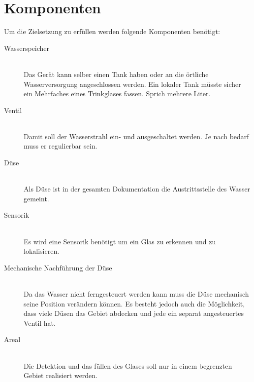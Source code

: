 \section{Komponenten}


Um die Zielsetzung zu erfüllen werden folgende Komponenten benötigt:

	\begin{description}
		\item[Wasserspeicher] \hfill \\ 
			Das Gerät kann selber einen Tank haben oder an die örtliche Wasserversorgung angeschlossen werden. Ein lokaler Tank müsste sicher ein Mehrfaches eines Trinkglases fassen. Sprich mehrere Liter.
		\item[Ventil] \hfill \\ 
			Damit soll der Wasserstrahl ein- und ausgeschaltet werden. Je nach bedarf muss er regulierbar sein.
		\item[Düse] \hfill \\
			Als Düse ist in der gesamten Dokumentation die Austrittsstelle des Wasser gemeint.
		\item[Sensorik] \hfill \\
			Es wird eine Sensorik benötigt um ein Glas zu erkennen und zu lokalisieren.
		\item[Mechanische Nachführung der Düse] \hfill \\
			Da das Wasser nicht ferngesteuert werden kann muss die Düse mechanisch seine Position verändern können. Es besteht jedoch auch die Möglichkeit, dass viele Düsen das Gebiet abdecken und jede ein separat angesteuertes Ventil hat.
		\item[Areal] \hfill \\
			Die Detektion und das füllen des Glases soll nur in einem begrenzten Gebiet realisiert werden.
			
	\end{description}